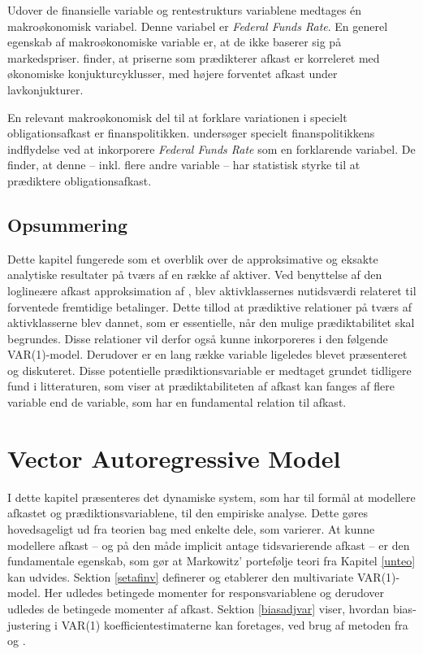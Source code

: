 \documentclass[
  a4paper,
  oneside]{memoir}
\begin{document}
Udover de finansielle variable og rentestrukturs variablene medtages én makroøkonomisk variabel. Denne variabel er \emph{Federal Funds Rate}. En generel egenskab af makroøkonomiske variable er, at de ikke baserer sig på markedspriser. \citep{Cochrane2008} finder, at priserne som prædikterer afkast er korreleret med økonomiske konjukturcyklusser, med højere forventet afkast under lavkonjukturer.

En relevant makroøkonomisk del til at forklare variationen i specielt obligationsafkast er finanspolitikken. \citep{Dai2005} undersøger specielt finanspolitikkens indflydelse ved at inkorporere \emph{Federal Funds Rate} som en forklarende variabel. De finder, at denne -- inkl. flere andre variable -- har statistisk styrke til at prædiktere obligationsafkast.

\hypertarget{opsafkrel}{%
\section{Opsummering}\label{opsafkrel}}

Dette kapitel fungerede som et overblik over de approksimative og eksakte analytiske resultater på tværs af en række af aktiver. Ved benyttelse af den loglineære afkast approksimation af \citep{Campbell1988}, blev aktivklassernes nutidsværdi relateret til forventede fremtidige betalinger. Dette tillod at prædiktive relationer på tværs af aktivklasserne blev dannet, som er essentielle, når den mulige prædiktabilitet skal begrundes. Disse relationer vil derfor også kunne inkorporeres i den følgende VAR(1)-model. Derudover er en lang række variable ligeledes blevet præsenteret og diskuteret. Disse potentielle prædiktionsvariable er medtaget grundet tidligere fund i litteraturen, som viser at prædiktabiliteten af afkast kan fanges af flere variable end de variable, som har en fundamental relation til afkast.

\hypertarget{varkapitel}{%
\chapter{Vector Autoregressive Model}\label{varkapitel}}

I dette kapitel præsenteres det dynamiske system, som har til formål at modellere afkastet og prædiktionsvariablene, til den empiriske analyse. Dette gøres hovedsageligt ud fra teorien bag \citep{Userguide2004} med enkelte dele, som varierer. At kunne modellere afkast -- og på den måde implicit antage tidsvarierende afkast -- er den fundamentale egenskab, som gør at Markowitz' portefølje teori fra Kapitel \ref{unteo} kan udvides. Sektion \ref{setafinv} definerer og etablerer den multivariate VAR(1)-model. Her udledes betingede momenter for responsvariablene og derudover udledes de betingede momenter af afkast. Sektion \ref{biasadjvar} viser, hvordan bias-justering i VAR(1) koefficientestimaterne kan foretages, ved brug af metoden fra \citep{Engsted2012} og \citep{Pope1990}.
\end{document}
